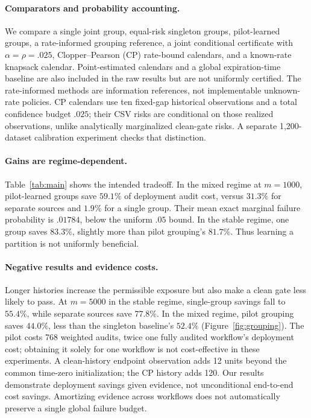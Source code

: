 \documentclass{article}
\newcommand{\1}{\mathbf 1}
\begin{document}
\paragraph{Comparators and probability accounting.}
We compare a single joint group, equal-risk singleton groups, pilot-learned groups, a rate-informed grouping reference, a joint conditional certificate with $\alpha=\rho=.025$, Clopper--Pearson (CP) rate-bound calendars, and a known-rate knapsack calendar. Point-estimated calendars and a global expiration-time baseline are also included in the raw results but are not uniformly certified. The rate-informed methods are information references, not implementable unknown-rate policies. CP calendars use ten fixed-gap historical observations and a total confidence budget $.025$; their CSV risks are conditional on those realized observations, unlike analytically marginalized clean-gate risks. A separate 1,200-dataset calibration experiment checks that distinction.

\begin{table}[t]
\centering\small
\caption{Mean \emph{deployment} audit cost saved (\%) at $m=1000$, $\delta=.05$, ten seeds. Pilot and historical acquisition costs are excluded from this table and reported separately. The conditional-certificate methods provide a stronger guarantee; their smaller savings are not evidence that they are incorrectly designed.}\label{tab:main}
\end{table}

\paragraph{Gains are regime-dependent.}
Table~\ref{tab:main} shows the intended tradeoff. In the mixed regime at $m=1000$, pilot-learned groups save $59.1\%$ of deployment audit cost, versus $31.3\%$ for separate sources and $1.9\%$ for a single group. Their mean exact marginal failure probability is $.01784$, below the uniform $.05$ bound. In the stable regime, one group saves $83.3\%$, slightly more than pilot grouping's $81.7\%$. Thus learning a partition is not uniformly beneficial.

\paragraph{Negative results and evidence costs.}
Longer histories increase the permissible exposure but also make a clean gate less likely to pass. At $m=5000$ in the stable regime, single-group savings fall to $55.4\%$, while separate sources save $77.8\%$. In the mixed regime, pilot grouping saves $44.0\%$, less than the singleton baseline's $52.4\%$ (Figure~\ref{fig:grouping}). The pilot costs 768 weighted audits, twice one fully audited workflow's deployment cost; obtaining it solely for one workflow is not cost-effective in these experiments. A clean-history endpoint observation adds 12 units beyond the common time-zero initialization; the CP history adds 120. Our results demonstrate deployment savings given evidence, not unconditional end-to-end cost savings. Amortizing evidence across workflows does not automatically preserve a single global failure budget.
\end{document}
